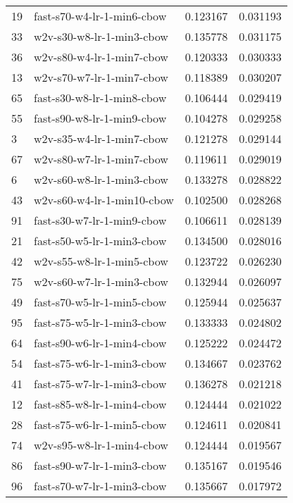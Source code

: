 \begin{tabular}{llrr}
19 &   fast-s70-w4-lr-1-min6-cbow &  0.123167 &  0.031193 \\
33 &    w2v-s30-w8-lr-1-min3-cbow &  0.135778 &  0.031175 \\
36 &    w2v-s80-w4-lr-1-min7-cbow &  0.120333 &  0.030333 \\
13 &    w2v-s70-w7-lr-1-min7-cbow &  0.118389 &  0.030207 \\
65 &   fast-s30-w8-lr-1-min8-cbow &  0.106444 &  0.029419 \\
55 &   fast-s90-w8-lr-1-min9-cbow &  0.104278 &  0.029258 \\
3  &    w2v-s35-w4-lr-1-min7-cbow &  0.121278 &  0.029144 \\
67 &    w2v-s80-w7-lr-1-min7-cbow &  0.119611 &  0.029019 \\
6  &    w2v-s60-w8-lr-1-min3-cbow &  0.133278 &  0.028822 \\
43 &   w2v-s60-w4-lr-1-min10-cbow &  0.102500 &  0.028268 \\
91 &   fast-s30-w7-lr-1-min9-cbow &  0.106611 &  0.028139 \\
21 &   fast-s50-w5-lr-1-min3-cbow &  0.134500 &  0.028016 \\
42 &    w2v-s55-w8-lr-1-min5-cbow &  0.123722 &  0.026230 \\
75 &    w2v-s60-w7-lr-1-min3-cbow &  0.132944 &  0.026097 \\
49 &   fast-s70-w5-lr-1-min5-cbow &  0.125944 &  0.025637 \\
95 &   fast-s75-w5-lr-1-min3-cbow &  0.133333 &  0.024802 \\
64 &   fast-s90-w6-lr-1-min4-cbow &  0.125222 &  0.024472 \\
54 &   fast-s75-w6-lr-1-min3-cbow &  0.134667 &  0.023762 \\
41 &   fast-s75-w7-lr-1-min3-cbow &  0.136278 &  0.021218 \\
12 &   fast-s85-w8-lr-1-min4-cbow &  0.124444 &  0.021022 \\
28 &   fast-s75-w6-lr-1-min5-cbow &  0.124611 &  0.020841 \\
74 &    w2v-s95-w8-lr-1-min4-cbow &  0.124444 &  0.019567 \\
86 &   fast-s90-w7-lr-1-min3-cbow &  0.135167 &  0.019546 \\
96 &   fast-s70-w7-lr-1-min3-cbow &  0.135667 &  0.017972 \\
\bottomrule
\end{tabular}
